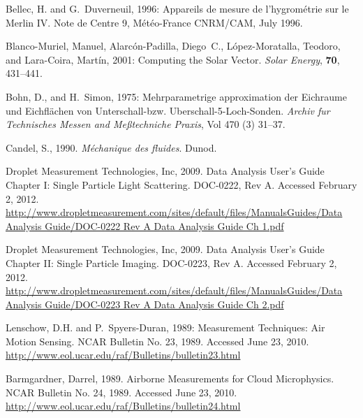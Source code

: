 \documentclass[a4paper,11pt]{report}
\begin{document}
\newpage{}
\begin{thebibliography}{5}

 Bellec, H. and G.~Duverneuil, 1996: Appareils de mesure de 
l'hygrom\'etrie sur le Merlin IV.  Note de Centre 9, M\'et\'eo-France 
CNRM/CAM, July 1996.

 Blanco-Muriel, Manuel, Alarc\'on-Padilla, Diego~C., L\'opez-Moratalla, Teodoro, 
and Lara-Coira, Mart\'in, 2001: Computing the Solar Vector. \emph{Solar Energy}, \textbf{70}, 431--441.

 Bohn, D., and H.~Simon, 1975: Mehrparametrige approximation der Eichraume und Eichfl\"achen von Unterschall-bzw. Uberschall-5-Loch-Sonden. \emph{Archiv fur Technisches Messen and Me{\ss}techniche Praxis}, Vol 470 (3) 31--37.

 Candel, S., 1990. \emph{M\'echanique des fluides}. Dunod.

 Droplet Measurement Technologies, Inc, 2009. Data Analysis User's Guide Chapter I:
Single Particle Light Scattering. DOC-0222, Rev A. Accessed February 2, 2012. 
\href{http://www.dropletmeasurement.com/sites/default/files/ManualsGuides/Data\%20Analysis\%20Guide/DOC-0222\%20Rev\%20A\%20Data\%20Analysis\%20Guide\%20Ch\%201.pdf}{http://www.dropletmeasurement.com/sites/default/files/ManualsGuides/Data Analysis Guide/DOC-0222 Rev A Data Analysis Guide Ch 1.pdf}

 Droplet Measurement Technologies, Inc, 2009. Data Analysis User's Guide Chapter II:
Single Particle Imaging. DOC-0223, Rev A. Accessed February 2, 2012. 
\href{http://www.dropletmeasurement.com/sites/default/files/ManualsGuides/Data\%20Analysis\%20Guide/DOC-0223\%20Rev\%20A\%20Data\%20Analysis\%20Guide\%20Ch\%202.pdf}{http://www.dropletmeasurement.com/sites/default/files/ManualsGuides/Data Analysis Guide/DOC-0223 Rev A Data Analysis Guide Ch 2.pdf}

 Lenschow, D.H. and P.~Spyers-Duran, 1989: Measurement Techniques: Air Motion Sensing.
NCAR Bulletin No. 23, 1989. Accessed June 23, 2010.
\href{http://www.eol.ucar.edu/raf/Bulletins/bulletin23.html}{http://www.eol.ucar.edu/raf/Bulletins/bulletin23.html}

 Barmgardner, Darrel, 1989. Airborne Measurements for Cloud Microphysics. 
NCAR Bulletin No. 24, 1989. Accessed June 23, 2010.  \href{http://www.eol.ucar.edu/raf/Bulletins/bulletin24.html}{http://www.eol.ucar.edu/raf/Bulletins/bulletin24.html}


\end{thebibliography}
\end{document}

